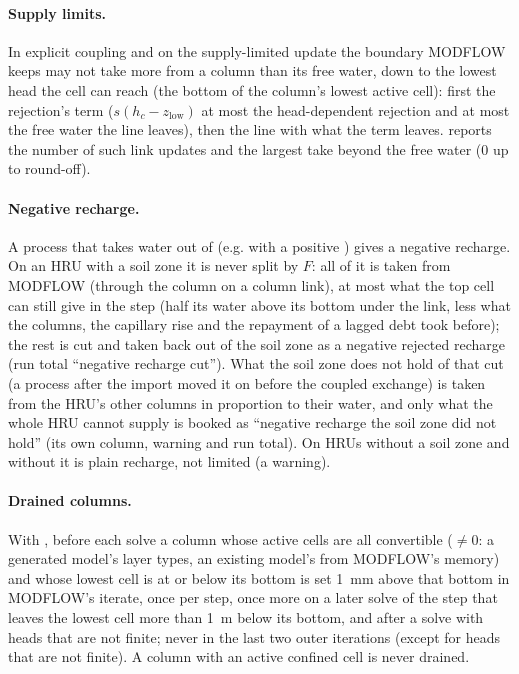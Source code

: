 \paragraph{Supply limits.} In explicit coupling and on the supply-limited update the boundary MODFLOW keeps may not take more
from a column than its free water, down to the lowest head the cell can reach (the bottom of the column's lowest active
cell): first the rejection's term ($s(h_c-z_{\mathrm{low}})$ at most the head-dependent rejection and at most the free water
the line leaves), then the line with what the term leaves.  reports the number of such link updates
and the largest take beyond the free water (0 up to round-off).

\paragraph{Negative recharge.}\label{sec:negrecharge} A process that takes water out of  (e.g.  with a positive ) gives a negative recharge. On an HRU with a soil zone it is never split by $F$: all
of it is taken from MODFLOW (through the column on a column link), at most what the top cell can still give in the step
(half its water above its bottom under the link, less what the columns, the capillary rise and the repayment of a lagged
debt took before); the rest is cut and taken back out of the soil zone as a negative rejected recharge (run total ``negative
recharge cut''). What the soil zone does not hold of that cut (a process after the import moved it on before the coupled
exchange) is taken from the HRU's other columns in proportion to their water, and only what the whole HRU cannot supply is
booked as ``negative recharge the soil zone did not hold'' (its own  column, warning and run total). On HRUs
without a soil zone and without  it is plain recharge, not limited (a warning).

\paragraph{Drained columns.}\label{sec:drained} With , before each solve a column whose active cells are all convertible
($\neq0$: a generated model's layer types, an existing model's from MODFLOW's memory) and whose lowest cell is
at or below its bottom is set 1~mm above that bottom in MODFLOW's iterate, once per step, once more on a later solve of the
step that leaves the lowest cell more than 1~m below its bottom, and after a solve with heads that are not finite; never in
the last two outer iterations (except for heads that are not finite). A column with an active confined cell is never drained.

